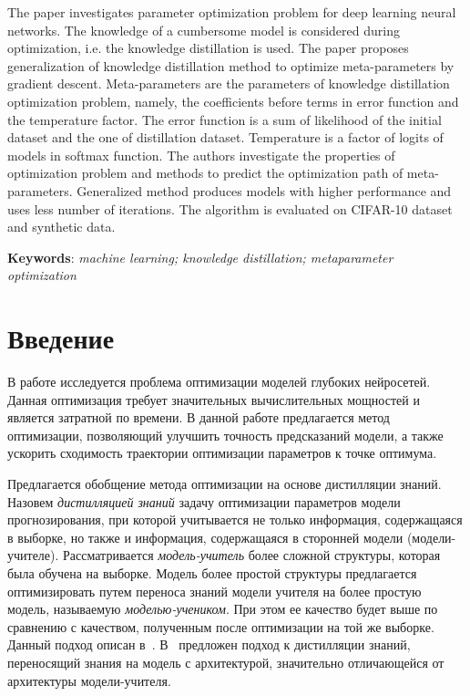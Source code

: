 \documentclass[12pt, twoside]{article}
\begin{document}
\abstractEng
{The paper investigates parameter optimization problem for deep learning neural networks. The knowledge of a cumbersome model is considered during optimization, i.e. the knowledge distillation is used. The paper proposes generalization of knowledge distillation method to optimize meta-parameters by gradient descent. Meta-parameters are the parameters of knowledge distillation optimization problem, namely, the coefficients before terms in error function and the temperature factor. The error function is a sum of likelihood of the initial dataset and the one of distillation dataset. Temperature is a factor of logits of models in softmax function. The authors investigate the properties of optimization problem and methods to predict the optimization path of meta-parameters. Generalized method produces models with higher performance and uses less number of iterations. The algorithm is evaluated on CIFAR-10 dataset and synthetic data.


\noindent
\textbf{Keywords}: \emph{machine learning; knowledge distillation; metaparameter optimization}}

\doi{}
\receivedRus{}
\receivedEng{}

\maketitle
\linenumbers

\section{Введение}
В работе исследуется проблема оптимизации моделей глубоких нейросетей. Данная оптимизация требует значительных вычислительных мощностей и является затратной по времени. В данной работе предлагается метод оптимизации, позволяющий улучшить точность предсказаний модели, а также ускорить сходимость траектории оптимизации параметров к точке оптимума.

Предлагается обобщение метода оптимизации на основе дистилляции знаний. Назовем \textit{дистилляцией знаний} задачу оптимизации параметров модели прогнозирования, при которой учитывается не только информация, содержащаяся в выборке, но также и информация, содержащаяся в сторонней модели (модели-учителе). Рассматривается \textit{модель-учитель} более сложной структуры, которая была обучена на выборке. Модель более простой структуры предлагается оптимизировать путем переноса знаний модели учителя на более простую модель, называемую \textit{моделью-учеником}. При этом ее качество будет выше по сравнению с качеством, полученным после оптимизации на той же выборке. Данный подход описан в~\cite{journals/corr/HintonVD15}. В~\cite{conf/cvpr/PassalisTT20} предложен подход к дистилляции знаний, переносящий знания на модель с архитектурой, значительно отличающейся от архитектуры модели-учителя.
\end{document}

